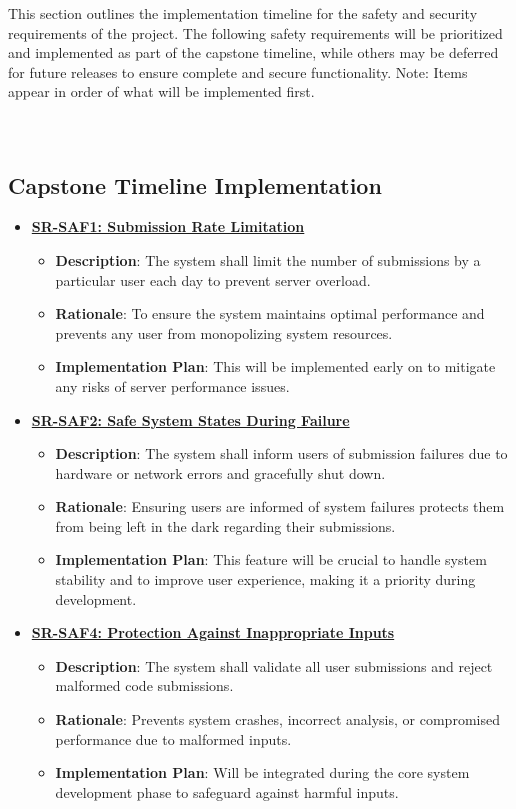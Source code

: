 \documentclass{article}
\begin{document}
This section outlines the implementation timeline for the safety and security requirements of the project. The following safety requirements will be prioritized and implemented as part of the capstone timeline, while others may be deferred for future releases to ensure complete and secure functionality. Note: Items appear in order of what will be implemented first.
\\ \\ \\
\subsection{Capstone Timeline Implementation}

\begin{itemize}
    \item \textbf{\hyperref[req:saf1]{SR-SAF1: Submission Rate Limitation}}
    \begin{itemize}
        \item \textbf{Description}: The system shall limit the number of submissions by a particular user each day to prevent server overload.
        \item \textbf{Rationale}: To ensure the system maintains optimal performance and prevents any user from monopolizing system resources.
        \item \textbf{Implementation Plan}: This will be implemented early on to mitigate any risks of server performance issues.
    \end{itemize}

    \item \textbf{\hyperref[req:saf2]{SR-SAF2: Safe System States During Failure}}
    \begin{itemize}
        \item \textbf{Description}: The system shall inform users of submission failures due to hardware or network errors and gracefully shut down.
        \item \textbf{Rationale}: Ensuring users are informed of system failures protects them from being left in the dark regarding their submissions.
        \item \textbf{Implementation Plan}: This feature will be crucial to handle system stability and to improve user experience, making it a priority during development.
    \end{itemize}

    \item \textbf{\hyperref[req:saf4]{SR-SAF4: Protection Against Inappropriate Inputs}}
    \begin{itemize}
        \item \textbf{Description}: The system shall validate all user submissions and reject malformed code submissions.
        \item \textbf{Rationale}: Prevents system crashes, incorrect analysis, or compromised performance due to malformed inputs.
        \item \textbf{Implementation Plan}: Will be integrated during the core system development phase to safeguard against harmful inputs.
    \end{itemize}


\end{itemize}
\end{document}
